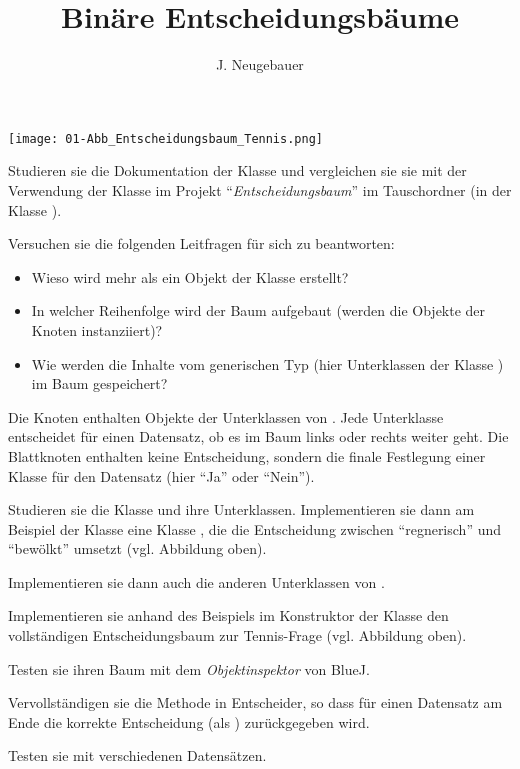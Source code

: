\documentclass[10pt, a4paper]{scrartcl}
\author{J. Neugebauer}
\title{Binäre Entscheidungsbäume}
\date{\Heute}
\begin{document}
\ReiheTitel

\begin{center}
	\texttt{[image: 01-Abb\_Entscheidungsbaum\_Tennis.png]}
\end{center}

\begin{aufgabe}
	Studieren sie die Dokumentation der Klasse  und vergleichen sie sie mit der Verwendung der Klasse im Projekt \enquote{\emph{Entscheidungsbaum}} im Tauschordner (in der Klasse ).
	
	Versuchen sie die folgenden Leitfragen für sich zu beantworten:
	\begin{itemize}
		\item Wieso wird mehr als ein Objekt der Klasse  erstellt?
		\item In welcher Reihenfolge wird der Baum aufgebaut (werden die Objekte der Knoten instanziiert)?
		\item Wie werden die Inhalte vom generischen Typ  (hier Unterklassen der Klasse ) im Baum gespeichert?
	\end{itemize}
\end{aufgabe}


\begin{aufgabe}
	Die Knoten enthalten Objekte der Unterklassen von . Jede Unterklasse entscheidet für einen Datensatz, ob es im Baum links oder rechts weiter geht. Die Blattknoten enthalten keine Entscheidung, sondern die finale Festlegung einer Klasse für den Datensatz (hier \enquote{Ja} oder \enquote{Nein}).
	
	Studieren sie die Klasse  und ihre Unterklassen. Implementieren sie dann am Beispiel der Klasse  eine Klasse , die die Entscheidung
	zwischen \enquote{regnerisch} und \enquote{bewölkt} umsetzt (vgl. Abbildung oben).
	
	Implementieren sie dann auch die anderen Unterklassen von .
\end{aufgabe}

\begin{aufgabe}
	Implementieren sie anhand des Beispiels im Konstruktor der Klasse  den vollständigen Entscheidungsbaum zur Tennis-Frage (vgl. Abbildung oben).
	
	Testen sie ihren Baum mit dem \emph{Objektinspektor} von BlueJ.
\end{aufgabe}

\begin{aufgabe}
	Vervollständigen sie die Methode  in Entscheider, so dass für einen Datensatz am Ende die korrekte Entscheidung (als ) zurückgegeben wird.
	
	Testen sie mit verschiedenen Datensätzen.
\end{aufgabe}
\end{document}
